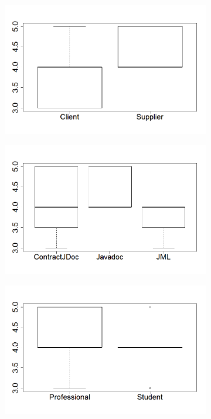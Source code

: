 \begin{figure}
\centering
\begin{subfigure}{.3\textwidth}
\includegraphics[width=1\linewidth]{figs/boxplotTasksEmpiricalStudy}
\caption{}
\label{fig:tasksEmpirical}
\end{subfigure}
\begin{subfigure}{.3\textwidth}
\includegraphics[width=1\linewidth]{figs/boxplotApproachesEmpiricalStudy}
\caption{}
\label{fig:approachesEmpirical}
\end{subfigure}
\begin{subfigure}{.3\textwidth}
\includegraphics[width=1\linewidth]{figs/boxplotExperienceEmpiricalStudy}

\end{subfigure}
\end{figure}
